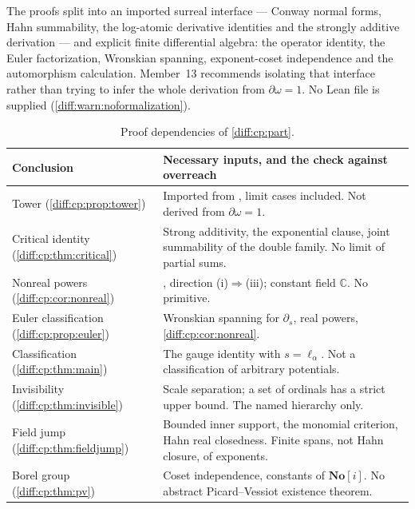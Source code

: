 \documentclass[11pt,letterpaper]{article}
\numberwithin{equation}{section}
\theoremstyle{definition}
\theoremstyle{remark}
\newcommand{\SC}{\mathbf{No}[i]}
\newcommand{\C}{\mathbb C}
\newcommand{\der}{\partial}
\begin{document}
\begin{remark}
\label{diff:cp:rem:formalization}
The proofs split into an imported surreal interface --- Conway normal forms,
Hahn summability, the log-atomic derivative identities and the strongly
additive derivation --- and explicit finite differential algebra: the operator
identity, the Euler factorization, Wronskian spanning, exponent-coset
independence and the automorphism calculation. Member~13 recommends isolating
that interface rather than trying to infer the whole derivation from
$\der\omega=1$. No Lean file is supplied (\cref{diff:warn:noformalization}).
\end{remark}

\begin{table}[htbp]
\centering\small
\caption{Proof dependencies of \cref{diff:cp:part}.}
\label{diff:cp:tab:dependencies}
\begin{tabularx}{\textwidth}{@{}L{0.27\textwidth}Y@{}}
\toprule
Conclusion & Necessary inputs, and the check against overreach \\
\midrule
Tower (\cref{diff:cp:prop:tower}) & Imported from \cite{ADH}, limit cases
included. Not derived from $\der\omega=1$. \\
Critical identity (\cref{diff:cp:thm:critical}) & Strong additivity, the
exponential clause, joint summability of the double family. No limit of partial
sums. \\
Nonreal powers (\cref{diff:cp:cor:nonreal}) & ,
direction (i)$\Rightarrow$(iii); constant field $\C$. No primitive. \\
Euler classification (\cref{diff:cp:prop:euler}) & Wronskian spanning for
$\der_{s}$, real powers, \cref{diff:cp:cor:nonreal}. \\
Classification (\cref{diff:cp:thm:main}) & The gauge identity with
$s=\ell_{\alpha}$. Not a classification of arbitrary potentials. \\
Invisibility (\cref{diff:cp:thm:invisible}) & Scale separation; a set of
ordinals has a strict upper bound. The named hierarchy only. \\
Field jump (\cref{diff:cp:thm:fieldjump}) & Bounded inner support, the monomial
criterion, Hahn real closedness. Finite spans, not Hahn closure, of exponents. \\
Borel group (\cref{diff:cp:thm:pv}) & Coset independence, constants of $\SC$.
No abstract Picard--Vessiot existence theorem. \\
\bottomrule
\end{tabularx}
\end{table}
\end{document}
